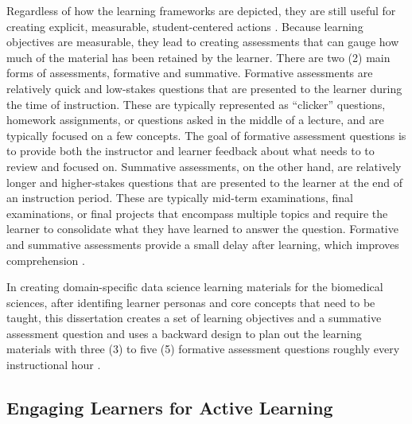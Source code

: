 \documentclass[010-intro.tex]{subfiles}
\begin{document}
        Regardless of how the learning frameworks are depicted,
        they are still useful for creating explicit, measurable, student-centered actions
        \cite{wilson2019teaching, ambrose2010learning}.
        Because learning objectives are measurable, they lead to creating assessments that can gauge
        how much of the material has been retained by the learner.
        There are two (2) main forms of assessments, formative and summative.
        Formative assessments are relatively quick and low-stakes questions that are presented to the learner
        during the time of instruction.
        These are typically represented as ``clicker'' questions, homework assignments, or questions asked in the middle of a lecture,
        and are typically focused on a few concepts.
        The goal of formative assessment questions is to provide both the instructor and learner
        feedback about what needs to to review and focused on.
        Summative assessments, on the other hand, are relatively longer and higher-stakes questions that are presented
        to the learner at the end of an instruction period.
        These are typically mid-term examinations, final examinations, or final projects
        that encompass multiple topics and require the learner to consolidate what they have learned to answer the question.
        Formative and summative assessments provide a small delay after learning,
        which improves comprehension
        \cite{andersonWhyDelayedSummaries2008,}.

        In creating domain-specific data science learning materials for the biomedical sciences,
        after identifing learner personas and core concepts that need to be taught,
        this dissertation creates a set of learning objectives and a summative assessment question
        and uses a backward design to plan out the learning materials with three (3) to five (5)
        formative assessment questions roughly every instructional hour
        \cite{wilson2019teaching}.


    \subsection{Engaging Learners for Active Learning}
\end{document}
